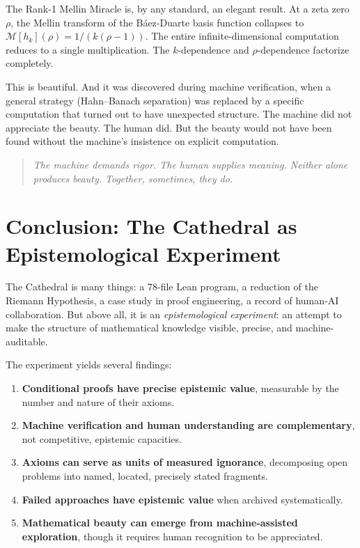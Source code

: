 \documentclass[11pt,a4paper]{article}
\begin{document}
The Rank-1 Mellin Miracle is, by any standard, an elegant result.
At a zeta zero $\rho$, the Mellin transform of the B\'aez-Duarte
basis function collapses to $\mathcal{M}[h_k](\rho) = 1/(k(\rho-1))$.
The entire infinite-dimensional computation reduces to a single
multiplication. The $k$-dependence and $\rho$-dependence factorize
completely.

This is beautiful. And it was discovered during machine verification,
when a general strategy (Hahn--Banach separation) was replaced by a
specific computation that turned out to have unexpected structure.
The machine did not appreciate the beauty. The human did. But the
beauty would not have been found without the machine's insistence
on explicit computation.

\begin{quote}
\emph{The machine demands rigor. The human supplies meaning.
Neither alone produces beauty. Together, sometimes, they do.}
\end{quote}

\section{Conclusion: The Cathedral as Epistemological Experiment}

The Cathedral is many things: a 78-file Lean program, a reduction
of the Riemann Hypothesis, a case study in proof engineering, a
record of human-AI collaboration. But above all, it is an
\emph{epistemological experiment}: an attempt to make the structure
of mathematical knowledge visible, precise, and machine-auditable.

The experiment yields several findings:

\begin{enumerate}
  \item \textbf{Conditional proofs have precise epistemic value},
    measurable by the number and nature of their axioms.
  \item \textbf{Machine verification and human understanding are
    complementary}, not competitive, epistemic capacities.
  \item \textbf{Axioms can serve as units of measured ignorance},
    decomposing open problems into named, located, precisely
    stated fragments.
  \item \textbf{Failed approaches have epistemic value} when
    archived systematically.
  \item \textbf{Mathematical beauty can emerge from machine-assisted
    exploration}, though it requires human recognition to be
    appreciated.
\end{enumerate}
\end{document}
